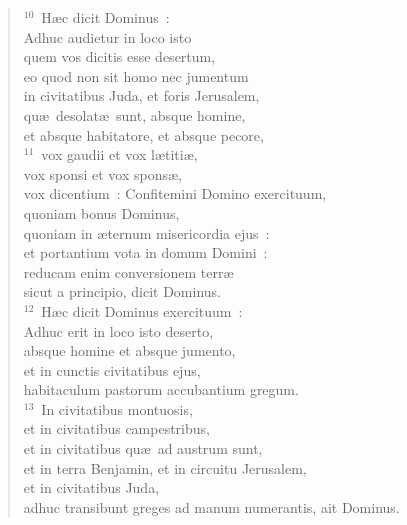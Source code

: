 \begin{flushleft}
\begin{verse}
${}^{10}$~H\ae c dicit Dominus~:\\ Adhuc audietur in loco isto\\ quem vos dicitis esse desertum,\\ eo quod non sit homo nec jumentum\\ in civitatibus Juda, et foris Jerusalem,\\ qu\ae\ desolat\ae\ sunt, absque homine,\\ et absque habitatore, et absque pecore,\\
${}^{11}$~vox gaudii et vox l\ae titi\ae ,\\ vox sponsi et vox spons\ae ,\\ vox dicentium~: Confitemini Domino exercituum,\\ quoniam bonus Dominus,\\ quoniam in \ae ternum misericordia ejus~:\\ et portantium vota in domum Domini~:\\ reducam enim conversionem terr\ae \\ sicut a principio, dicit Dominus.\\
${}^{12}$~H\ae c dicit Dominus exercituum~:\\ Adhuc erit in loco isto deserto,\\ absque homine et absque jumento,\\ et in cunctis civitatibus ejus,\\ habitaculum pastorum accubantium gregum.\\
${}^{13}$~In civitatibus montuosis,\\ et in civitatibus campestribus,\\ et in civitatibus qu\ae\ ad austrum sunt,\\ et in terra Benjamin, et in circuitu Jerusalem,\\ et in civitatibus Juda,\\ adhuc transibunt greges ad manum numerantis, ait Dominus.\end{verse}\end{flushleft}


